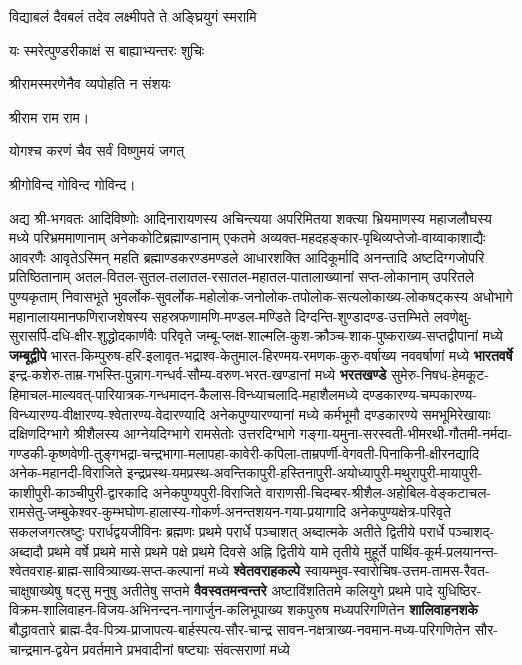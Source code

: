 {विद्याबलं दैवबलं तदेव लक्ष्मीपते ते अङ्घ्रियुगं स्मरामि}

{यः स्मरेत्पुण्डरीकाक्षं स बाह्याभ्यन्तरः शुचिः}

{श्रीरामस्मरणेनैव व्यपोहति न संशयः}

श्रीराम राम राम। 

{योगश्च करणं चैव सर्वं विष्णुमयं जगत्}

श्रीगोविन्द गोविन्द गोविन्द। 

अद्य श्री-भगवतः आदिविष्णोः आदिनारायणस्य अचिन्त्यया अपरिमितया शक्त्या भ्रियमाणस्य महाजलौघस्य मध्ये
परिभ्रम\-माणानाम् अनेक\-कोटि\-ब्रह्माण्डानाम् एकतमे अव्यक्त-महदहङ्कार-पृथिव्यप्तेजो-वाय्वाकाशाद्यैः आवरणैः
आवृते\-ऽस्मिन् महति ब्रह्माण्डकरण्डमण्डले आधारशक्ति आदिकूर्मादि अनन्तादि अष्टदिग्गजोपरि
प्रतिष्ठितानाम् अतल-वितल-सुतल-तलातल-रसातल-महातल-पातालाख्यानां सप्त-लोकानाम् उपरितले
पुण्यकृताम् निवासभूते
भुवर्लोक-सुवर्लोक-महोलोक-जनोलोक-तपोलोक-सत्यलोकाख्य-लोकषट्कस्य अधोभागे महानालायमान\-फणि\-राज\-शेषस्य 
सहस्र\-फणामणि-मण्डल-मण्डिते दिग्दन्ति-शुण्डादण्ड-उत्तम्भिते 
लवणेक्षु-सुरासर्पि-दधि-क्षीर-शुद्धोदकार्णवैः परिवृते
जम्बू-प्लक्ष-शाल्मलि-कुश-क्रौञ्च-शाक-पुष्कराख्य-सप्तद्वीपानां मध्ये \textbf{जम्बूद्वीपे}
भारत-किम्पुरुष-हरि-इलावृत-भद्राश्व-केतुमाल-हिरण्मय-रमणक-कुरु-वर्षाख्य नववर्षाणां मध्ये \textbf{भारतवर्षे}
इन्द्र-कशेरु-ताम्र-गभस्ति-पुन्नाग-गन्धर्व-सौम्य-वरुण-भरत-खण्डानां मध्ये \textbf{भरतखण्डे}
सुमेरु-निषध-हेमकूट-हिमाचल-माल्यवत्-पारियात्रक-गन्धमादन-कैलास-विन्ध्याचलादि-महा\-शैल\-मध्ये
दण्डकारण्य-चम्पकारण्य-विन्ध्यारण्य-वीक्षारण्य-श्वेतारण्य-वेदारण्यादि अनेक\-पुण्या\-रण्यानां मध्ये
कर्मभूमौ दण्डकारण्ये समभूमिरेखायाः दक्षिणदिग्भागे श्रीशैलस्य आग्नेयदिग्भागे रामसेतोः उत्तर\-दिग्भागे
गङ्गा-यमुना-सरस्वती-भीमरथी-गौतमी-नर्मदा-गण्डकी-कृष्णवेणी-तुङ्गभद्रा-चन्द्रभागा-मलापहा-कावेरी-कपिला-ताम्रपर्णी-वेगवती-पिनाकिनी-क्षीरनद्यादि
अनेक-महानदी-विराजिते
इन्द्रप्रस्थ-यमप्रस्थ-अवन्तिका\-पुरी-हस्तिनापुरी-अयोध्या\-पुरी-मथुरा\-पुरी-मायापुरी-काशीपुरी-काञ्चीपुरी-द्वारकादि अनेक\-पुण्यपुरी-विराजिते
वाराणसी-चिदम्बर-श्रीशैल-अहोबिल-वेङ्कटाचल-रामसेतु-जम्बुकेश्वर-कुम्भघोण-हालास्य-गोकर्ण-अनन्तशयन-गया-प्रयागादि
अनेकपुण्यक्षेत्र-परिवृते सकलजगत्स्रष्टुः परार्धद्वयजीविनः ब्रह्मणः प्रथमे परार्धे पञ्चाशत्
अब्दात्मके अतीते द्वितीये परार्धे पञ्चाशद्-अब्दादौ प्रथमे वर्षे प्रथमे मासे प्रथमे पक्षे प्रथमे
दिवसे अह्नि द्वितीये यामे तृतीये मुहूर्ते
पार्थिव-कूर्म-प्रलयानन्त-श्वेतवराह-ब्राह्म-सावित्र्याख्य-सप्त-कल्पानां मध्ये \textbf{श्वेतवराहकल्पे}
स्वायम्भुव-स्वारोचिष-उत्तम-तामस-रैवत-चाक्षुषाख्येषु षट्सु मनुषु अतीतेषु सप्तमे \textbf{वैवस्वतमन्वन्तरे}
अष्टाविंशतितमे कलियुगे प्रथमे पादे युधिष्ठिर-विक्रम-शालिवाहन-विजय-अभिनन्दन-नागार्जुन-कलिभूपाख्य
शकपुरुष मध्यपरि\-गणितेन \textbf{शालिवाहनशके} बौद्धावतारे ब्राह्म-दैव-पित्र्य-प्राजापत्य-बार्हस्पत्य-सौर-चान्द्र
सावन-नक्षत्राख्य-नवमान-मध्य-परि\-गणितेन सौर-चान्द्रमान-द्वयेन प्रवर्तमाने प्रभवादीनां षष्ट्याः
संवत्सराणां मध्ये 
\yutithyadi


